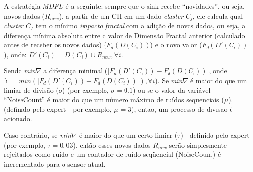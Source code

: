 \documentclass{acm_proc_article-sp}
\begin{document}
A estratégia {\it MDFD} é a seguinte:
sempre que o sink recebe ``novidades'', ou seja, novos dados ($R_{new}$), a
partir de um CH em um dado {\it cluster} $C_j$, ele calcula qual {\it cluster}
$C_I$ tem o mínimo \textit{impacto fractal} com a adição de novos dados, ou
seja, a diferença mínima absoluta entre o valor de Dimensão Fractal anterior
(calculado antes de receber os novos dados) ($F_d(D(C_i))$) e o novo valor
($F_d(D'(C_i))$), onde:
 $D'(C_i) = D(C_i) \cup R_{new}, \forall i$.
\vspace*{-.3cm}

Sendo {\it min}$\nabla$ a diferença minimal ($|F_d(D'(C_{\hat{\imath}})) -
F_d(D(C_{\hat{\imath}}))|$, onde $\hat{\imath} = min(|F_d(D'(C_i)) -
F_d(D(C_i))|), \forall i$). Se {\it min}$\nabla$ é maior do que um limiar de
divisão ($\sigma$) (por exemplo, $\sigma = 0.1$) ou se o valor da variável
``NoiseCount'' é maior do que um número máximo de ruídos sequenciais ($\mu$),
(definido pelo expert - por exemplo, $\mu$ = 3), então, um processo de
divisão é acionado.
\vspace*{-.3cm}

Caso contrário, se {\it min}$\nabla$ é maior do que um certo limiar ($\tau$)
- definido pelo expert (por exemplo, $\tau = 0,03$), então 
esses novos dados $R_{new}$ serão simplesmente rejeitados como ruído e 
um contador de ruído seqüencial (NoiseCount) é incrementado para o sensor
atual.
\vspace*{-.3cm}
\end{document}
